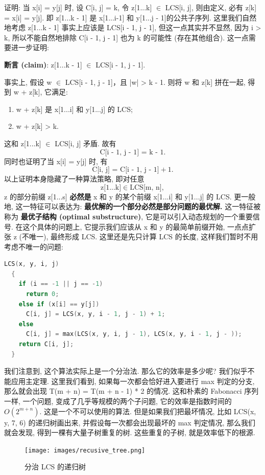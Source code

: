\documentclass[a4paper]{ctexart}
\theoremstyle{definition}
\theoremstyle{definition}
\begin{document}
证明: 当 x[i] = y[j] 时, 设 C[i, j] = k, 令 z[1...k] $\in$ LCS[i, j], 
则由定义, 必有 z[k] = x[i] = y[j]. 即 z[1...k - 1] 是 x[1...i-1] 和 y[1...j - 1]的公共子序列. 
这里我们自然地考虑 z[1...k - 1] 事实上应该是 LCS[i - 1, j - 1], 
但这一点其实并不显然, 因为 i > k, 所以不能自然地排除 C[i - 1, j - 1] 
也为 k 的可能性 (存在其他组合). 这一点需要进一步证明:

\textbf{断言 (claim)}: z[1...k - 1] $\in$ LCS[i - 1, j - 1].

事实上, 假设 w $\in$ LCS[i - 1, j - 1]，且 |w| > k - 1. 
则将 w 和 z[k] 拼在一起, 得到 w + z[k], 它满足:
\begin{enumerate}
  \item w + z[k] 是 x[1...i] 和 y[1...j] 的 LCS;
  \item w + z[k] > k.
\end{enumerate}
这和 z[1...k] $\in$ LCS[i, j] 矛盾. 故有
$$
\mbox{C[i - 1, j - 1] = k - 1}.
$$
同时也证明了当 x[i] = y[j] 时, 有
$$
\mbox{C[i, j] = C[i - 1, j - 1]} + 1.
$$
以上证明本身隐藏了一种算法策略, 即对任意
$$
\mbox{z[1...k]} \in \mbox{LCS[m, n]},
$$
z 的部分前缀 z[1...s] \textbf{必然是} x 和 y 的某个前缀 x[1...i] 和 y[1...j] 的 LCS. 
更一般地, 这一特征可以表达为: \textbf{最优解的一个部分必然是部分问题的最优解.} 
这一特征被称为 \textbf{最优子结构 (optimal substructure)}, 
它是可以引入动态规划的一个重要信号. 在这个具体的问题上, 
它提示我们应该从 x 和 y 的最简单前缀开始, 一点点扩张 z (不唯一), 
最终形成 LCS. 这里还是先只计算 LCS 的长度, 这样我们暂时不用考虑不唯一的问题:

\begin{lstlisting}[language=c++]
  LCS(x, y, i, j)
  {
    if (i == -1 || j == -1)
      return 0;
    else if (x[i] == y[j])
      C[i, j] = LCS(x, y, i - 1, j - 1) + 1;
    else
      C[i, j] = max(LCS(x, y, i, j - 1), LCS(x, y, i - 1, j - ));
    return C[i, j];
  }    
\end{lstlisting}

我们注意到, 这个算法实际上是一个分治法. 那么它的效率是多少呢? 
我们似乎不能应用主定理. 这里我们看到, 如果每一次都会恰好进入要进行 max 判定的分支,
那么就会出现 T(m + n) = T(m + n - 1) * 2 的情况. 这和朴素的 Fabonacci 序列一样, 
一个问题, 变成了几乎等规模的两个子问题, 它的效率是指数时间的 $O(2^{m + n})$. 
这是一个不可以使用的算法. 但是如果我们把最坏情况, 比如 LCS(x, y, 7, 6) 的递归树画出来, 
并假设每一次都会出现最坏的 max 判定情况, 那么我们就会发现, 
得到一棵有大量子树重复的树. 这些重复的子树, 就是效率低下的根源.

\begin{figure}[h]  
  \centering  
  \texttt{[image: images/recusive\_tree.png]} 
  \caption{分治 LCS 的递归树} %
\end{figure}  
\end{document}
